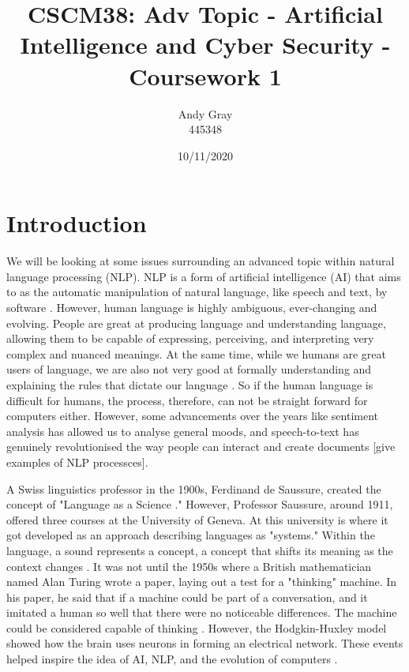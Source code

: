 \documentclass[a4paper,10pt]{article}
\begin{document}
\title{CSCM38: Adv Topic - Artificial Intelligence and Cyber Security - Coursework 1}
\author{Andy Gray\\445348}
\date{10/11/2020}

\maketitle

\section{Introduction}
\label{sec:intro}
	We will be looking at some issues surrounding an advanced topic within natural language processing (NLP).  NLP is a form of artificial intelligence  (AI) that aims to as the automatic manipulation of natural language, like speech and text, by software \cite{nlp_definition}. However, human language is highly ambiguous, ever-changing and evolving. People are great at producing language and understanding language, allowing them to be capable of expressing, perceiving, and interpreting very complex and nuanced meanings. At the same time, while we humans are great users of language, we are also not very good at formally understanding and explaining the rules that dictate our language \cite{goldberg2017neural}. So if the human language is difficult for humans, the process, therefore, can not be straight forward for computers either. However, some advancements over the years like sentiment analysis has allowed us to analyse general moods, and speech-to-text has genuinely revolutionised the way people can interact and create documents [give examples of NLP processces]. 
	
	A Swiss linguistics professor in the 1900s, Ferdinand de Saussure, created the concept of "Language as a Science \cite{koerner2013ferdinand}." However, Professor Saussure, around 1911, offered three courses at the University of Geneva. At this university is where it got developed as an approach describing languages as "systems." Within the language, a sound represents a concept, a concept that shifts its meaning as the context changes \cite{nlp_history}. It was not until the 1950s where a British mathematician named Alan Turing wrote a paper, laying out a test for a "thinking" machine. In his paper, he said that if a machine could be part of a conversation, and it imitated a human so well that there were no noticeable differences. The machine could be considered capable of thinking \cite{turing2004can}. However, the Hodgkin-Huxley model showed how the brain uses neurons in forming an electrical network. These events helped inspire the idea of AI, NLP, and the evolution of computers \cite{nlp_history}.
	
\end{document}
